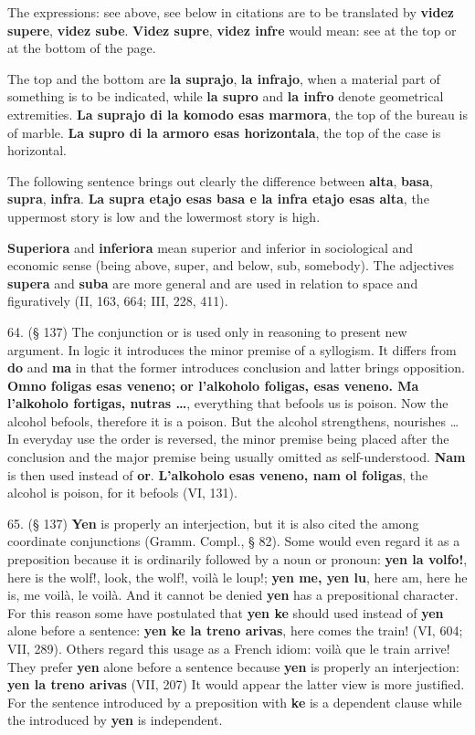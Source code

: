 The expressions: see above, see below in citations are to be translated by \textbf{videz supere}, \textbf{videz sube}. \textbf{Videz supre}, \textbf{videz infre} would mean: see at the top or at the bottom of the page.

The top and the bottom are \textbf{la suprajo}, \textbf{la infrajo}, when a material part of something is to be indicated, while \textbf{la supro} and \textbf{la infro} denote geometrical extremities. \textbf{La suprajo di la komodo esas marmora}, the top of the bureau is of marble. \textbf{La supro di la armoro esas horizontala}, the top of the case is horizontal.

The following sentence brings out clearly the difference between \textbf{alta}, \textbf{basa}, \textbf{supra}, \textbf{infra}. \textbf{La supra etajo esas basa e la infra etajo esas alta}, the uppermost story is low and the lowermost story is high.

\textbf{Superiora} and \textbf{inferiora} mean superior and inferior in sociological and economic sense (being above, super, and below, sub, somebody). The adjectives \textbf{supera} and \textbf{suba} are more general and are used in relation to space and figuratively (II, 163, 664; III, 228, 411).

64. (§ 137) The conjunction or is used only in reasoning to present new argument. In logic it introduces the minor premise of a syllogism. It differs from \textbf{do} and \textbf{ma} in that the former introduces conclusion and latter brings opposition. \textbf{Omno foligas esas veneno; or l'alkoholo foligas, esas veneno. Ma l'alkoholo fortigas, nutras \ldots}, everything that befools us is poison. Now the alcohol befools, therefore it is a poison. But the alcohol strengthens, nourishes \ldots In everyday use the order is reversed, the minor premise being placed after the conclusion and the major premise being usually omitted as self-understood. \textbf{Nam} is then used instead of \textbf{or}. \textbf{L'alkoholo esas veneno, nam ol foligas}, the alcohol is poison, for it befools (VI, 131). %

65. (§ 137) \textbf{Yen} is properly an interjection, but it is also cited the among coordinate conjunctions (Gramm. Compl., § 82). Some would even regard it as a preposition because it is ordinarily followed by a noun or pronoun: \textbf{yen la volfo!}, here is the wolf!, look, the wolf!, voilà le loup!; \textbf{yen me, yen lu}, here am, here he is, me voilà, le voilà. And it cannot be denied \textbf{yen} has a prepositional character. For this reason some have postulated that \textbf{yen ke} should used instead of \textbf{yen} alone before a sentence: \textbf{yen ke la treno arivas}, here comes the train! (VI, 604; VII, 289). Others regard this usage as a French idiom: voilà que le train arrive! They prefer \textbf{yen} alone before a sentence because \textbf{yen} is properly an interjection: \textbf{yen la treno arivas} (VII, 207) It would appear the latter view is more justified. For the sentence introduced by a preposition with \textbf{ke} is a dependent clause while the introduced by \textbf{yen} is independent. %

